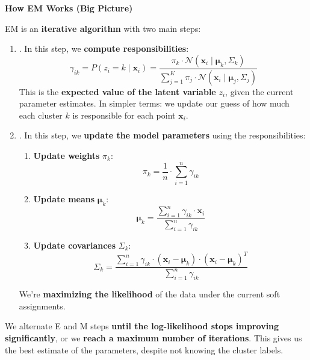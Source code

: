 \highspace
\begin{flushleft}
    \textcolor{Green3}{ \textbf{How EM Works (Big Picture)}}
\end{flushleft}
EM is an \textbf{iterative algorithm} with two main steps:
\begin{enumerate}
    \item {}. In this step, we \textbf{compute responsibilities}:
    \begin{equation*}
        \gamma_{ik} = P\left(z_i = k \mid \mathbf{x}_i\right) = \frac{\pi_k \cdot \mathcal{N}\left(\mathbf{x}_i \mid \boldsymbol{\mu}_k, \Sigma_k\right)}{\displaystyle\sum_{j=1}^K \pi_j \cdot \mathcal{N}\left(\mathbf{x}_i \mid \boldsymbol{\mu}_j, \Sigma_j\right)}
    \end{equation*}
    This is the \textbf{expected value of the latent variable} $z_{i}$, given the current parameter estimates. In simpler terms: we update our guess of how much each cluster $k$ is responsible for each point $\mathbf{x}_{i}$.
    
    \item {}. In this step, we \textbf{update the model parameters} using the responsibilities:
    \begin{enumerate}
        \item \textbf{Update weights} $\pi_k$:
        \begin{equation*}
            \pi_k = \dfrac{1}{n} \cdot \displaystyle\sum_{i=1}^{n} \gamma_{ik}
        \end{equation*}

        \item \textbf{Update means} $\boldsymbol{\mu}_k$:
        \begin{equation*}
            \boldsymbol{\mu}_k = \dfrac{
                \displaystyle\sum_{i=1}^{n} \gamma_{ik} \cdot \mathbf{x}_i
            }{
                \displaystyle\sum_{i=1}^{n} \gamma_{ik}
            }
        \end{equation*}

        \item \textbf{Update covariances} $\Sigma_k$:
        \begin{equation*}
            \Sigma_k = \dfrac{
                \displaystyle\sum_{i=1}^{n} \gamma_{ik} \cdot \left(\mathbf{x}_i - \boldsymbol{\mu}_k\right) \cdot \left(\mathbf{x}_i - \boldsymbol{\mu}_k\right)^{T}
            }{
                \displaystyle\sum_{i=1}^{n} \gamma_{ik}
            }
        \end{equation*}
    \end{enumerate}
    We're \textbf{maximizing the likelihood} of the data under the current soft assignments.
\end{enumerate}
We alternate E and M steps \textbf{until the log-likelihood stops improving significantly}, or we \textbf{reach a maximum number of iterations}. This gives us the best estimate of the parameters, despite not knowing the cluster labels.

